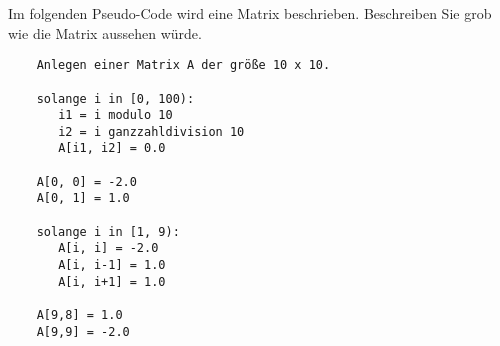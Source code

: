 Im folgenden Pseudo-Code wird eine Matrix beschrieben. Beschreiben Sie grob wie die Matrix aussehen würde.
\begin{verbatim}
	Anlegen einer Matrix A der größe 10 x 10.
	
	solange i in [0, 100):
	   i1 = i modulo 10
	   i2 = i ganzzahldivision 10
	   A[i1, i2] = 0.0
		
	A[0, 0] = -2.0
	A[0, 1] = 1.0
	
	solange i in [1, 9):
	   A[i, i] = -2.0
	   A[i, i-1] = 1.0
	   A[i, i+1] = 1.0
		
	A[9,8] = 1.0
	A[9,9] = -2.0
\end{verbatim}
